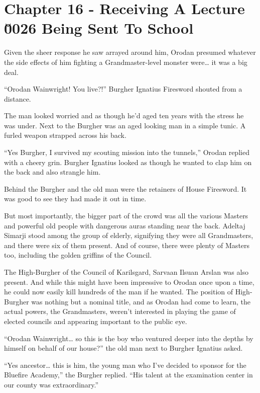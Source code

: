 \documentclass[a4paper,10pt]{book}
\begin{document}
\section*{Chapter 16 - Receiving A Lecture \u0026 Being Sent To School}
%
\par
Given the sheer response he saw arrayed around him, Orodan presumed whatever the side effects of him fighting a Grandmaster-level monster were… it was a big deal.\par
“Orodan Wainwright! You live?!” Burgher Ignatius Firesword shouted from a distance.\par
The man looked worried and as though he’d aged ten years with the stress he was under. Next to the Burgher was an aged looking man in a simple tunic. A furled weapon strapped across his back.\par
“Yes Burgher, I survived my scouting mission into the tunnels,” Orodan replied with a cheery grin. Burgher Ignatius looked as though he wanted to clap him on the back and also strangle him.\par
Behind the Burgher and the old man were the retainers of House Firesword. It was good to see they had made it out in time.\par
But most importantly, the bigger part of the crowd was all the various Masters and powerful old people with dangerous auras standing near the back. Adeltaj Simarji stood among the group of elderly, signifying they were all Grandmasters, and there were six of them present. And of course, there were plenty of Masters too, including the golden griffins of the Council.\par
The High-Burgher of the Council of Karilsgard, Sarvaan Ilsuan Arslan was also present. And while this might have been impressive to Orodan once upon a time, he could now easily kill hundreds of the man if he wanted. The position of High-Burgher was nothing but a nominal title, and as Orodan had come to learn, the actual powers, the Grandmasters, weren’t interested in playing the game of elected councils and appearing important to the public eye.\par
“Orodan Wainwright… so this is the boy who ventured deeper into the depths by himself on behalf of our house?” the old man next to Burgher Ignatius asked.\par
“Yes ancestor… this is him, the young man who I’ve decided to sponsor for the Bluefire Academy,” the Burgher replied. “His talent at the examination center in our county was extraordinary.”\par
\end{document}

